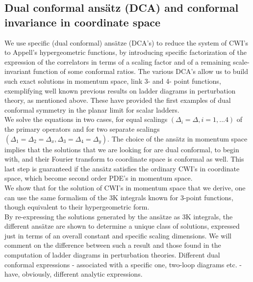 \documentclass[a4paper,11pt,openright,twoside]{book}
\numberwithin{equation}{section}
\begin{document}
{\subsection{Dual conformal ans\"atz (DCA) and conformal invariance in coordinate space}
We use specific (dual conformal) ans\"atze (DCA's) to reduce the system of CWI's to Appell's hypergeometric functions, by introducing specific factorization of the expression of the correlators in terms of a scaling factor and of a remaining scale-invariant function of some conformal ratios. The various DCA's allow us to build such exact solutions in momentum space, link 3- and 4- point functions, exemplifying well known previous results  \cite{Davydychev:1992xr, Usyukina:1992jd,Usyukina:1993ch,Broadhurst:1993ru,Eden:1998hh,Eden:2000mv} on ladder diagrams in perturbation theory, as mentioned above. These have provided the first examples of dual conformal symmetry in the planar limit for scalar ladders.\\
We solve the equations in two cases, for equal scalings $(\Delta_i=\Delta, i=1,...4)$ of the primary operators and for two separate scalings $(\Delta_1=\Delta_2=\Delta_x, \Delta_3=\Delta_4=\Delta_y)$. 
The choice of the ans\"atz in momentum space implies that the solutions that we are looking for are dual conformal, to begin with, and their Fourier transform to coordinate space is conformal as well. This last step is guaranteed if the ans\"atz satisfies the ordinary CWI's in coordinate space, which become second order PDE's in momentum space. \\
We show that for the solution of CWI's in momentum space that we derive, one can use the same formalism of the 3K integrals known for 3-point functions, though equivalent to their hypergeometric form.\\
By re-expressing the solutions generated by the ans\"atze as 3K integrals, the different ans\"atze are shown to determine a unique class of solutions, expressed just in terms of an overall constant and specific scaling dimensions. We will comment on the difference between such a result and those found in the computation of ladder diagrams in perturbation theories. Different dual conformal expressions - associated with a specific one, two-loop diagrams etc. - have, obviously, different analytic expressions.
}
\end{document}

